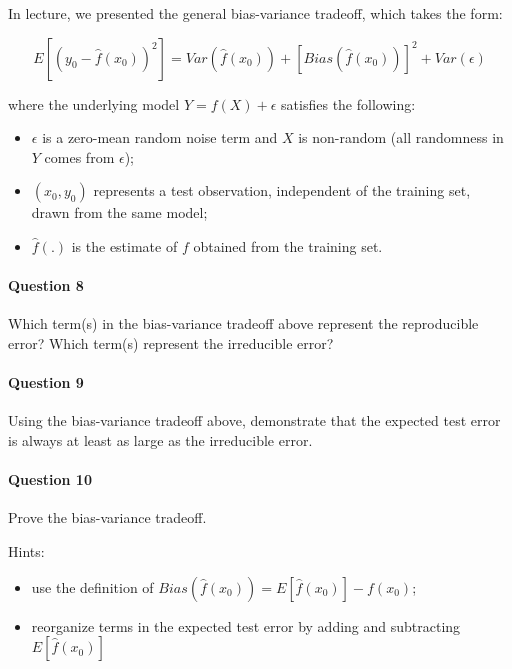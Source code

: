 \documentclass[
]{article}
\providecommand{\tightlist}{%
  \setlength{\itemsep}{0pt}\setlength{\parskip}{0pt}}
\begin{document}
In lecture, we presented the general bias-variance tradeoff, which takes
the form:

\[
E[(y_0 - \hat{f}(x_0))^2]=Var(\hat{f}(x_0))+[Bias(\hat{f}(x_0))]^2+Var(\epsilon)
\]

where the underlying model \(Y=f(X)+\epsilon\) satisfies the following:

\begin{itemize}
\tightlist
\item
  \(\epsilon\) is a zero-mean random noise term and \(X\) is non-random
  (all randomness in \(Y\) comes from \(\epsilon\));
\item
  \((x_0, y_0)\) represents a test observation, independent of the
  training set, drawn from the same model;
\item
  \(\hat{f}(.)\) is the estimate of \(f\) obtained from the training
  set.
\end{itemize}

\hypertarget{question-8}{%
\paragraph{Question 8}\label{question-8}}

Which term(s) in the bias-variance tradeoff above represent the
reproducible error? Which term(s) represent the irreducible error?

\hypertarget{question-9}{%
\paragraph{Question 9}\label{question-9}}

Using the bias-variance tradeoff above, demonstrate that the expected
test error is always at least as large as the irreducible error.

\hypertarget{question-10}{%
\paragraph{Question 10}\label{question-10}}

Prove the bias-variance tradeoff.

Hints:

\begin{itemize}
\tightlist
\item
  use the definition of \(Bias(\hat{f}(x_0))=E[\hat{f}(x_0)]-f(x_0)\);
\item
  reorganize terms in the expected test error by adding and subtracting
  \(E[\hat{f}(x_0)]\)
\end{itemize}
\end{document}
